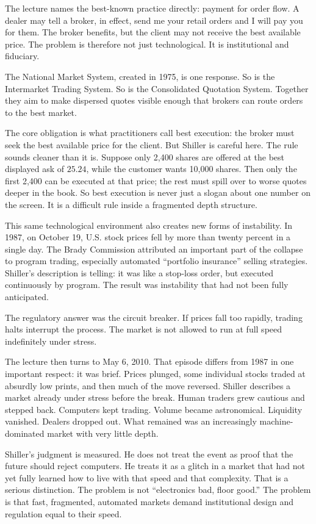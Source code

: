 The lecture names the best-known practice directly: payment for order flow. A dealer may tell a broker, in effect, send me your retail orders and I will pay you for them. The broker benefits, but the client may not receive the best available price. The problem is therefore not just technological. It is institutional and fiduciary.

The National Market System, created in 1975, is one response. So is the Intermarket Trading System. So is the Consolidated Quotation System. Together they aim to make dispersed quotes visible enough that brokers can route orders to the best market.

The core obligation is what practitioners call best execution: the broker must seek the best available price for the client. But Shiller is careful here. The rule sounds cleaner than it is. Suppose only 2,400 shares are offered at the best displayed ask of \(25.24\), while the customer wants 10,000 shares. Then only the first 2,400 can be executed at that price; the rest must spill over to worse quotes deeper in the book. So best execution is never just a slogan about one number on the screen. It is a difficult rule inside a fragmented depth structure.

This same technological environment also creates new forms of instability. In 1987, on October 19, U.S. stock prices fell by more than twenty percent in a single day. The Brady Commission attributed an important part of the collapse to program trading, especially automated ``portfolio insurance'' selling strategies. Shiller's description is telling: it was like a stop-loss order, but executed continuously by program. The result was instability that had not been fully anticipated.

The regulatory answer was the circuit breaker. If prices fall too rapidly, trading halts interrupt the process. The market is not allowed to run at full speed indefinitely under stress.

The lecture then turns to May 6, 2010. That episode differs from 1987 in one important respect: it was brief. Prices plunged, some individual stocks traded at absurdly low prints, and then much of the move reversed. Shiller describes a market already under stress before the break. Human traders grew cautious and stepped back. Computers kept trading. Volume became astronomical. Liquidity vanished. Dealers dropped out. What remained was an increasingly machine-dominated market with very little depth.

Shiller's judgment is measured. He does not treat the event as proof that the future should reject computers. He treats it as a glitch in a market that had not yet fully learned how to live with that speed and that complexity. That is a serious distinction. The problem is not ``electronics bad, floor good.'' The problem is that fast, fragmented, automated markets demand institutional design and regulation equal to their speed.

